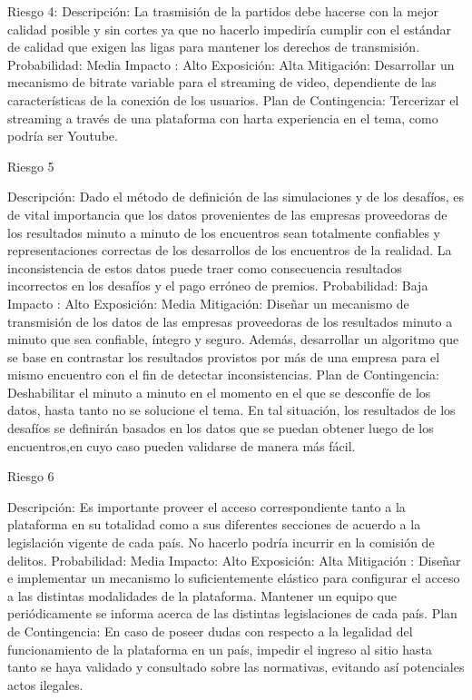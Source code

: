 Riesgo 4: 
Descripción: La trasmisión de la partidos debe hacerse con la mejor calidad posible y sin cortes ya que no hacerlo impediría cumplir con el estándar de calidad que exigen las ligas para mantener los derechos de transmisión.
Probabilidad: Media
Impacto : Alto
Exposición: Alta
Mitigación: Desarrollar un mecanismo de bitrate variable para el streaming de video, dependiente de las características de la conexión de los usuarios.
Plan de Contingencia: Tercerizar el streaming a través de una plataforma con harta experiencia en el tema, como podría ser Youtube.


Riesgo 5

Descripción: Dado el método de definición de las simulaciones y de los desafíos, es de vital
importancia que los datos provenientes de las empresas proveedoras de los resultados minuto a minuto de los encuentros sean totalmente confiables y representaciones correctas de los desarrollos de los encuentros de la realidad. La inconsistencia de estos datos puede traer como consecuencia resultados incorrectos en los desafíos y el pago erróneo de premios.
Probabilidad: Baja
Impacto : Alto
Exposición: Media
Mitigación: Diseñar un mecanismo de transmisión de los datos de las empresas proveedoras de los resultados minuto a minuto que sea confiable, íntegro y seguro.
Además, desarrollar un algoritmo que se base en contrastar los resultados provistos por más de una empresa para el mismo encuentro con el fin de detectar inconsistencias.
Plan de Contingencia: Deshabilitar el minuto a minuto en el momento en el que se desconfíe de los datos, hasta tanto no se solucione el tema. En tal situación, los resultados de los desafíos se definirán basados en los datos que se puedan obtener luego de los encuentros,en cuyo caso pueden validarse de manera más fácil.


Riesgo 6

Descripción: Es importante proveer el acceso correspondiente tanto a la plataforma en su totalidad como a sus diferentes secciones de acuerdo a la legislación vigente de cada país. No hacerlo podría incurrir en la comisión de delitos.
Probabilidad: Media
Impacto: Alto
Exposición: Alta
Mitigación : Diseñar e implementar un mecanismo lo suficientemente elástico para configurar el acceso a las distintas modalidades de la plataforma. Mantener un equipo que periódicamente se informa acerca de las distintas legislaciones de cada país.
Plan de Contingencia: En caso de poseer dudas con respecto a la legalidad del funcionamiento de la plataforma en un país, impedir el ingreso al sitio hasta tanto se haya validado y consultado sobre las normativas, evitando así potenciales actos ilegales.


